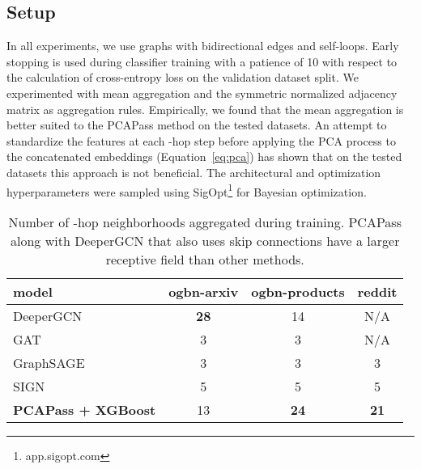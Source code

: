 \documentclass[nohyperref]{article}
\theoremstyle{plain}
\theoremstyle{definition}
\theoremstyle{remark}
\begin{document}
\subsection{Setup}
In all experiments, we use graphs with bidirectional edges and self-loops. Early stopping is used during classifier training with a patience of 10 with respect to the calculation of cross-entropy loss on the validation dataset split. We experimented with mean aggregation and the symmetric normalized adjacency matrix as aggregation rules. Empirically, we found that the mean aggregation is better suited to the PCAPass method on the tested datasets. An attempt to standardize the features at each -hop step before applying the PCA process to the concatenated embeddings (Equation~\ref{eq:pca}) has shown that on the tested datasets this approach is not beneficial. The architectural and optimization hyperparameters were sampled using SigOpt\footnote{app.sigopt.com} for Bayesian optimization.

\begin{table}[H]
        \centering
        \caption{Number of -hop neighborhoods aggregated during training. 
        PCAPass along with DeeperGCN that also uses skip connections have a larger receptive field than other methods.}
        \label{khop-table}
\vskip 0.15in
        \begin{center}
        \begin{small}
        \begin{sc}
        \fontsize{6.5}{7}\selectfont
        \begin{tabular}{lccc}
        \toprule
        \textbf{model} & \textbf{ogbn-arxiv} & \phantom{1} \textbf{ogbn-products} & \phantom{1} \textbf{reddit} \\
        \midrule
        DeeperGCN&\phantom{1}\textbf{28}&\phantom{1}14&  \phantom{1}N/A\\
        GAT&\phantom{1}3&\phantom{1}3&\phantom{1}N/A\\
        GraphSAGE&\phantom{1}3&\phantom{1}3&\phantom{1}3\\
        SIGN&\phantom{1}5&\phantom{1}5&\phantom{1}5\\
        \textbf{PCAPass + XGBoost}&\phantom{1}13&\phantom{1}\textbf{24}&\phantom{1}\textbf{21}\\
        \bottomrule
        \end{tabular}
        \end{sc}
        \end{small}
        \end{center}
        \vskip -0.1in
        \end{table}
\end{document}

